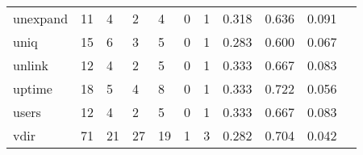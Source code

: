 \begin{longtable}{lp{1.2cm}p{1.2cm}p{1.2cm}p{1.2cm}p{1.2cm}p{1.2cm}p{1.2cm}p{1.2cm}p{1.2cm}p{1.2cm}}
unexpand  &                                    11 &                                                  4 &                                                  2 &                                                  4 &                                                  0 &                                                  1 &                                              0.318 &                                              0.636 &                                              0.091 \\
uniq      &                                    15 &                                                  6 &                                                  3 &                                                  5 &                                                  0 &                                                  1 &                                              0.283 &                                              0.600 &                                              0.067 \\
unlink    &                                    12 &                                                  4 &                                                  2 &                                                  5 &                                                  0 &                                                  1 &                                              0.333 &                                              0.667 &                                              0.083 \\
uptime    &                                    18 &                                                  5 &                                                  4 &                                                  8 &                                                  0 &                                                  1 &                                              0.333 &                                              0.722 &                                              0.056 \\
users     &                                    12 &                                                  4 &                                                  2 &                                                  5 &                                                  0 &                                                  1 &                                              0.333 &                                              0.667 &                                              0.083 \\
vdir      &                                    71 &                                                 21 &                                                 27 &                                                 19 &                                                  1 &                                                  3 &                                              0.282 &                                              0.704 &                                              0.042 \\

\end{longtable}
